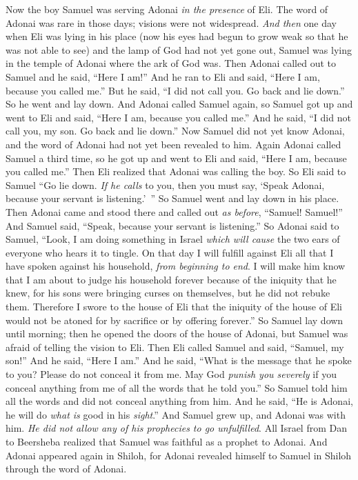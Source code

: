 \begin{biblechapter} %
 Now the boy Samuel was serving Adonai \textit{in the presence} of Eli. The word of Adonai was rare in those days; visions were not widespread.
\verse \textit{And then} one day when Eli was lying in his place (now his eyes had begun to grow weak so that he was not able to see)
\verse and the lamp of God had not yet gone out, Samuel was lying in the temple of Adonai where the ark of God was.
\verse Then Adonai called out to Samuel and he said, “Here I am!”
\verse And he ran to Eli and said, “Here I am, because you called me.” But he said, “I did not call you. Go back and lie down.” So he went and lay down.
\verse And Adonai called Samuel again, so Samuel got up and went to Eli and said, “Here I am, because you called me.” And he said, “I did not call you, my son. Go back and lie down.”
\verse Now Samuel did not yet know Adonai, and the word of Adonai had not yet been revealed to him.
\verse Again Adonai called Samuel a third time, so he got up and went to Eli and said, “Here I am, because you called me.” Then Eli realized that Adonai was calling the boy.
\verse So Eli said to Samuel “Go lie down. \textit{If he calls} to you, then you must say, ‘Speak Adonai, because your servant is listening.’ ” So Samuel went and lay down in his place.
\verse Then Adonai came and stood there and called out \textit{as before}, “Samuel! Samuel!” And Samuel said, “Speak, because your servant is listening.”
\verse So Adonai said to Samuel, “Look, I am doing something in Israel \textit{which will cause} the two ears of everyone who hears it to tingle.
\verse On that day I will fulfill against Eli all that I have spoken against his household, \textit{from beginning to end}.
\verse I will make him know that I am about to judge his household forever because of the iniquity that he knew, for his sons were bringing curses on themselves, but he did not rebuke them.
\verse Therefore I swore to the house of Eli that the iniquity of the house of Eli would not be atoned for by sacrifice or by offering forever.”
\verse So Samuel lay down until morning; then he opened the doors of the house of Adonai, but Samuel was afraid of telling the vision to Eli.
\verse Then Eli called Samuel and said, “Samuel, my son!” And he said, “Here I am.”
\verse And he said, “What is the message that he spoke to you? Please do not conceal it from me. May God \textit{punish you severely} if you conceal anything from me of all the words that he told you.”
\verse So Samuel told him all the words and did not conceal anything from him. And he said, “He is Adonai, he will do \textit{what is} good in his \textit{sight}.”
\verse And Samuel grew up, and Adonai was with him. \textit{He did not allow any of his prophecies to go unfulfilled}.
\verse All Israel from Dan to Beersheba realized that Samuel was faithful as a prophet to Adonai.
\verse And Adonai appeared again in Shiloh, for Adonai revealed himself to Samuel in Shiloh through the word of Adonai.
\end{biblechapter}

